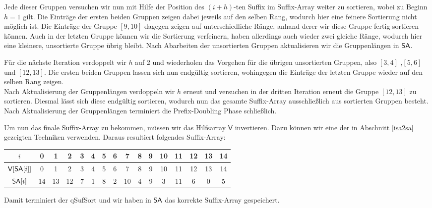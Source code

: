 Jede dieser Gruppen versuchen wir nun mit Hilfe der Position des $(i+h)$-ten Suffix im Suffix-Array weiter zu sortieren, wobei zu Beginn $h=1$ gilt. 
Die Einträge der ersten beiden Gruppen zeigen dabei jeweils auf den selben Rang, wodurch hier eine feinere Sortierung nicht möglich ist. Die Einträge der Gruppe $[9,10]$ dagegen zeigen auf unterschiedliche Ränge, anhand derer wir diese Gruppe fertig sortieren können. Auch in der letzten Gruppe können wir die Sortierung verfeinern, haben allerdings auch wieder zwei gleiche Ränge, wodurch hier eine kleinere, unsortierte Gruppe übrig bleibt. Nach Abarbeiten der unsortierten Gruppen aktualisieren wir die Gruppenlängen in $\sa$.

Für die nächste Iteration verdoppelt wir $h$ auf 2 und wiederholen das Vorgehen für die übrigen unsortierten Gruppen, also $[3,4]$ ,$[5,6]$ und $[12,13]$. Die ersten beiden Gruppen lassen sich nun endgültig sortieren, wohingegen die Einträge der letzten Gruppe wieder auf den selben Rang zeigen.\\
Nach Aktualisierung der Gruppenlängen verdoppeln wir $h$ erneut und versuchen in der dritten Iteration erneut die Gruppe $[12,13]$ zu sortieren. Diesmal lässt sich diese endgültig sortieren, wodurch nun das gesamte Suffix-Array ausschließlich aus sortierten Gruppen besteht. Nach Aktualisierung der Gruppenlängen terminiert die Prefix-Doubling Phase schließlich.

Um nun das finale Suffix-Array zu bekommen, müssen wir das Hilfsarray $\mathsf{V}$ invertieren. Dazu können wir eine der in Abschnitt \ref{isa2sa} gezeigten Techniken verwenden. Daraus resultiert folgendes Suffix-Array:

\begin{center}
\begin{tabular}{| c | c | c | c | c | c | c | c | c | c | c | c | c | c | c | c |}
\hline
$i$ & 0 & 1 &2 &3 &4 &5 &6 &7 &8 &9 &10 &11 &12 &13 &14 \\
\hline
$\mathsf{V}[\sa[i]]$ & 0 & 1 & 2 &  3 & 4 & 5 & 6 & 7 & 8 & 9 & 10 & 11 & 12 & 13 & 14 \\
$\sa[i]$ & 14 & 13 & 12 & 7 & 1 & 8 & 2 & 10 & 4 & 9 & 3 & 11 & 6 & 0 & 5 \\
\hline
\end{tabular}
\end{center}

Damit terminiert der qSufSort und wir haben in $\sa$ das korrekte Suffix-Array gespeichert.
